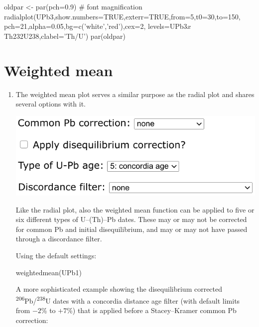 \begin{refsection}
\begin{enumerate}
\begin{script}
oldpar <- par(pch=0.9) # font magnification
radialplot(UPb3,show.numbers=TRUE,exterr=TRUE,from=5,t0=30,to=150,
           pch=21,alpha=0.05,bg=c('white','red'),cex=2,
           levels=UPb3$x$Th232U238,clabel='Th/U')
par(oldpar)
\end{script}

\end{enumerate}

\section{Weighted mean}
\label{sec:UPbWtdMean}

\begin{enumerate}
\item The weighted mean plot serves a similar purpose as the radial
  plot and shares several options with it.

\noindent\begin{minipage}[t]{.45\linewidth}
\strut\vspace*{-\baselineskip}\newline
\includegraphics[width=\linewidth]{../figures/UPbWtdMeanAgeType.png}
\end{minipage}
\begin{minipage}[t]{.55\linewidth}
  Like the radial plot, also the weighted mean function can be
  applied to five or six different types of U--(Th)--Pb dates. These
  may or may not be corrected for common Pb and initial
  disequilibrium, and may or may not have passed through a discordance
  filter.
\end{minipage}

Using the default settings:
\begin{console}
weightedmean(UPb1)
\end{console}

A more sophisticated example showing the disequilibrium corrected
\textsuperscript{206}Pb/\textsuperscript{238}U dates with a concordia
distance age filter (with default limits from $-2$\% to $+7$\%) that
is applied before a Stacey--Kramer common Pb correction:


\end{enumerate}
\end{refsection}
